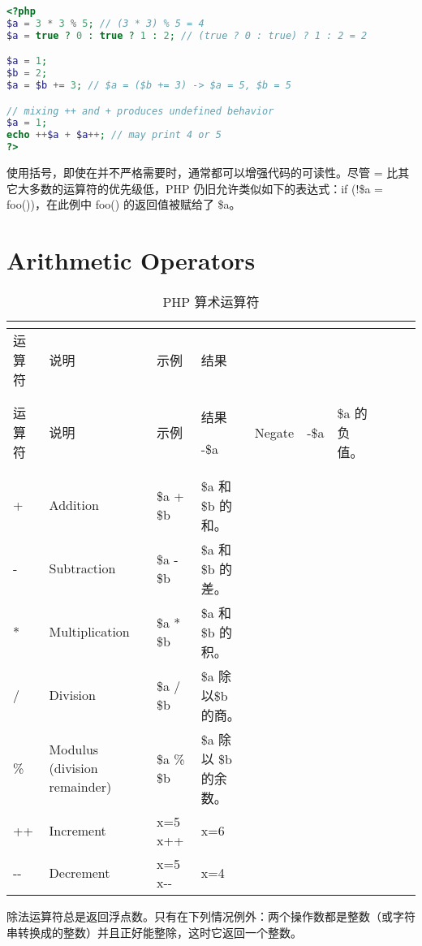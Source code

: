 \begin{lstlisting}[language=PHP]
<?php
$a = 3 * 3 % 5; // (3 * 3) % 5 = 4
$a = true ? 0 : true ? 1 : 2; // (true ? 0 : true) ? 1 : 2 = 2

$a = 1;
$b = 2;
$a = $b += 3; // $a = ($b += 3) -> $a = 5, $b = 5

// mixing ++ and + produces undefined behavior
$a = 1;
echo ++$a + $a++; // may print 4 or 5
?>
\end{lstlisting}

使用括号，即使在并不严格需要时，通常都可以增强代码的可读性。尽管 = 比其它大多数的运算符的优先级低，PHP 仍旧允许类似如下的表达式：if (!\$a = foo())，在此例中 foo() 的返回值被赋给了 \$a。

\section{Arithmetic Operators}

\begin{longtable}{|m{35pt}|m{180pt}|m{80pt}|m{30pt}|}
\tabularnewline\hline
运算符	&说明	&示例	&结果
\endhead

\caption{PHP 算术运算符}\\
\hline
运算符	&说明	&示例	&结果
\endfirsthead

\endfoot

\endlastfoot
\hline
-\$a &Negate		&-\$a					&\$a 的负值。\\
\hline
+	&Addition		&\$a + \$b		&\$a 和 \$b 的和。\\
\hline
-	&Subtraction	&\$a - \$b		&\$a 和 \$b 的差。\\
\hline
*	&Multiplication	&\$a * \$b		&\$a 和 \$b 的积。\\
\hline
/	&Division		&\$a / \$b		&\$a 除以\$b 的商。\\
\hline
\%	&Modulus (division remainder)	&\$a \% \$b &\$a 除以 \$b 的余数。\\
\hline
++	&Increment		& x=5 \newline x++	 &x=6\\
\hline
-\/-	&Decrement	&x=5 \newline x-\/-	&x=4\\
\hline

\end{longtable}

除法运算符总是返回浮点数。只有在下列情况例外：两个操作数都是整数（或字符串转换成的整数）并且正好能整除，这时它返回一个整数。

